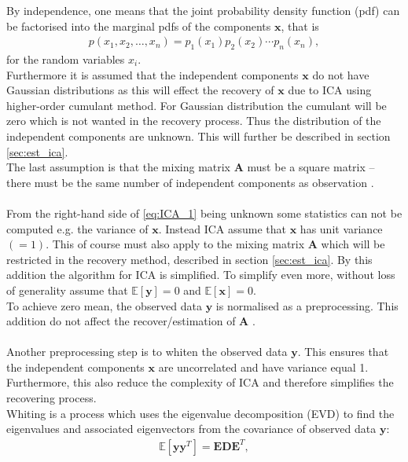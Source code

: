 By independence, one means that the joint probability density function (pdf) can be factorised into the marginal pdfs of the components $\mathbf{x}$, that is
\begin{align*}
p(x_1, x_2, \dots, x_n) = p_1 (x_1) p_2(x_2) \cdots p_n(x_n),
\end{align*}
for the random variables $x_i$.
\\
Furthermore it is assumed that the independent components $\mathbf{x}$ do not have Gaussian distributions as this will effect the recovery of $\mathbf{x}$ due to ICA using higher-order cumulant method. For Gaussian distribution the cumulant will be zero which is not wanted in the recovery process. Thus the distribution of the independent components are unknown. This will further be described in section \ref{sec:est_ica}.
\\
The last assumption is that the mixing matrix $\mathbf{A}$ must be a square matrix -- there must be the same number of independent components as observation \cite[p. 152-153]{ICA}.
\\ \\
From the right-hand side of \eqref{eq:ICA_1} being unknown some statistics can not be computed e.g. the variance of $\mathbf{x}$. Instead ICA assume that $\mathbf{x}$ has unit variance $(=1)$. This of course must also apply to the mixing matrix $\mathbf{A}$ which will be restricted in the recovery method, described in section \ref{sec:est_ica}. By this addition the algorithm for ICA is simplified. To simplify even more, without loss of generality assume that $\mathbb{E}[\mathbf{y}] = 0$ and $\mathbb{E}[\mathbf{x}] = 0$. 
\\
To achieve zero mean, the observed data $\mathbf{y}$ is  normalised as a preprocessing.
This addition do not affect the recover/estimation of $\mathbf{A}$ \cite[p. 154]{ICA}.
\\ \\
Another preprocessing step is to whiten the observed data $\mathbf{y}$. This ensures that the independent components $\mathbf{x}$ are uncorrelated and have variance equal 1. Furthermore, this also reduce the complexity of ICA and therefore simplifies the recovering process.
\\
Whiting is a process which uses the eigenvalue decomposition (EVD) to find the eigenvalues and associated eigenvectors from the covariance of observed data $\mathbf{y}$:
\begin{align*}
\mathbb{E}[\mathbf{yy}^T] = \mathbf{EDE}^T,
\end{align*}
